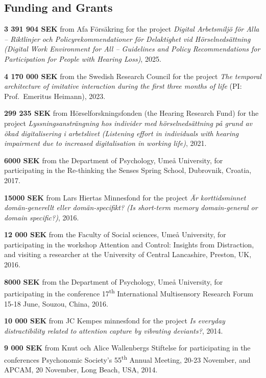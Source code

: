 \documentclass[]{article}
\begin{document}
\subsection{Funding and Grants}\label{funding-and-grants}

\textbf{3 391 904 SEK} from Afa Försäkring for the project \emph{Digital
Arbetsmiljö för Alla -- Riktlinjer och Policyrekommendationer för
Delaktighet vid Hörselnedsättning (Digital Work Environment for All --
Guidelines and Policy Recommendations for Participation for People with
Hearing Loss)}, 2025.

\textbf{4 170 000 SEK} from the Swedish Research Council for the project
\emph{The temporal architecture of imitative interaction during the
first three months of life} (PI: Prof.~Emeritus Heimann), 2023.

\textbf{299 235 SEK} from Hörselforskningsfonden (the Hearing Research
Fund) for the project \emph{Lyssningsansträngning hos individer med
hörselnedsättning på grund av ökad digitalisering i arbetslivet
(Listening effort in individuals with hearing impairment due to
increased digitalisation in working life)}, 2021.

\textbf{6000 SEK} from the Department of Psychology, Umeå University,
for participating in the Re-thinking the Senses Spring School,
Dubrovnik, Croatia, 2017.

\textbf{15000 SEK} from Lars Hiertas Minnesfond for the project \emph{Är
korttidsminnet domän-generellt eller domän-specifikt? (Is short-term
memory domain-general or domain specific?)}, 2016.

\textbf{12 000 SEK} from the Faculty of Social sciences, Umeå
University, for participating in the workshop Attention and Control:
Insights from Distraction, and visiting a researcher at the University
of Central Lancashire, Preston, UK, 2016.

\textbf{8000 SEK} from the Department of Psychology, Umeå University,
for participating in the conference 17\textsuperscript{th} International
Multisensory Research Forum 15-18 June, Souzou, China, 2016.

\textbf{10 000 SEK} from JC Kempes minnesfond for the project \emph{Is
everyday distractibility related to attention capture by vibrating
deviants?}, 2014.

\textbf{9 000 SEK} from Knut och Alice Wallenbergs Stiftelse for
participating in the conferences Psychonomic Society's
55\textsuperscript{th} Annual Meeting, 20-23 November, and APCAM, 20
November, Long Beach, USA, 2014.
\end{document}
